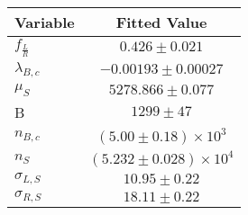 \begin{tabular}[t]{lc}
\hline
Variable &Fitted Value\\
\hline\hline
$f_{\frac{L}{R}}$&$0.426\pm0.021$\\
\hline
$\lambda_{B,c}$&$-0.00193\pm0.00027$\\
\hline
$\mu_S$&$5278.866\pm0.077$\\
\hline
B&$1299\pm47$\\
\hline
$n_{B,c}$&$(5.00\pm0.18)\times 10^3$\\
\hline
$n_S$&$(5.232\pm0.028)\times 10^4$\\
\hline
$\sigma_{L, S}$&$10.95\pm0.22$\\
\hline
$\sigma_{R, S}$&$18.11\pm0.22$\\
\hline
\end{tabular}